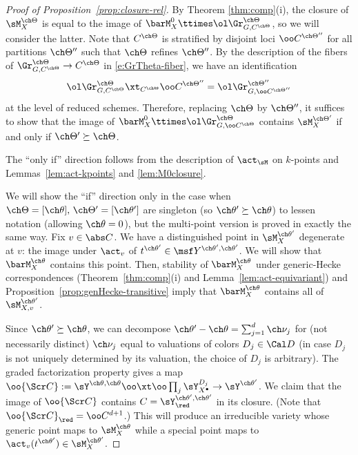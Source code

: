 \begin{proof}[{Proof of Proposition~\ref{prop:closure-rel}}]
By Theorem \ref{thm:comp}(i), the closure of $\sM^{\ch\Theta}_X$ is equal to
the image of $\barM^0_X \ttimes \ol\Gr^{\ch\Theta}_{G,C^{\ch\Theta}}$,
so we will consider the latter.
Note that $C^{\ch\Theta}$ is stratified by disjoint loci $\oo C^{\ch\Theta''}$
for all partitions $\ch\Theta''$ such that $\ch\Theta$ refines
$\ch\Theta''$. By the description of the fibers of
$\Gr^{\ch\Theta}_{G, C^{\ch\Theta}} \to C^{\ch\Theta}$ in
\eqref{e:GrTheta-fiber}, we have an identification
\[
\ol\Gr^{\ch\Theta}_{G,C^{\ch\Theta}} \xt_{C^{\ch\Theta}} \oo C^{\ch\Theta''}
= \ol\Gr^{\ch\Theta''}_{G, \oo C^{\ch\Theta''} }
\]
at the level of reduced schemes. Therefore, replacing $\ch\Theta$ by $\ch\Theta''$,
it suffices to show that
the image of $\barM_X^0 \ttimes \ol\Gr^{\ch\Theta}_{G, \oo C^{\ch\Theta}}$
contains $\sM_X^{\ch\Theta'}$ if and only if $\ch\Theta' \succeq \ch\Theta$.

The ``only if'' direction follows from the description of
$\act_\sM$ on $k$-points and Lemmas~\ref{lem:act-kpoints}
and \ref{lem:M0closure}.



We will show the ``if'' direction only
in the case when $\ch\Theta=[\ch\theta],\, \ch\Theta'=[\ch\theta']$
are singleton (so $\ch\theta'\succeq \ch\theta$) to lessen notation
(allowing $\ch\theta=0$), but the multi-point version is proved in
exactly the same way.
Fix $v\in \abs C$. We have a distinguished point in $\sM_X^{\ch\theta'}$ degenerate
at $v$: the image under $\act_v$ of $t^{\ch\theta'} \in \msf Y^{\ch\theta',\ch\theta'}$.
We will show that $\barM_X^{\ch\theta}$ contains this point.
Then, stability of $\barM_X^{\ch\theta}$ under generic-Hecke correspondences
(Theorem~\ref{thm:comp}(i) and Lemma~\ref{lem:act-equivariant})
and Proposition~\ref{prop:genHecke-transitive} imply that
$\barM_X^{\ch\theta}$ contains all of $\sM_{X,v}^{\ch\theta'}$.



Since $\ch\theta' \succeq \ch\theta$, we can decompose
$\ch\theta' - \ch\theta = \sum_{j=1}^d \ch\nu_j$ for (not necessarily distinct)
$\ch\nu_j$ equal to valuations of colors $D_j \in \Cal D$
(in case $D_j$ is not uniquely determined by its valuation, the choice of $D_j$ is arbitrary).
The graded factorization property gives a map
$\oo{\Scr C} := \sY^{\ch\theta,\ch\theta} \oo\xt \oo\prod_j \sY^{D_j}_{X^\bullet}
\to \sY^{\ch\theta'}$.
We claim that the image of
$\oo{\Scr C}$ contains $C=\sY^{\ch\theta',\ch\theta'}_\red$ in its closure.
(Note that $\oo{\Scr C}_\red = \oo C^{d+1}$.)
This will produce an irreducible variety whose generic point maps to $\sM_X^{\ch\theta}$
while a special point maps to $\act_v(t^{\ch\theta'}) \in \sM_X^{\ch\theta'}$.




\end{proof}
